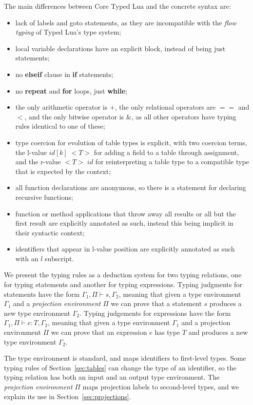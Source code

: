 \documentclass[preprint]{sigplanconf}
\newcommand{\env}{\Gamma}
\newcommand{\penv}{\Pi}
\begin{document}
The main differences between Core Typed Lua and the concrete
syntax are:
\begin{itemize}
\item lack of labels and goto statements, as they are incompatible
with the {\em flow typing} of Typed Lua's type system;
\item local variable declarations have an explicit block,
instead of being just statements;
\item no {\bf elseif} clause in {\bf if} statements;
\item no {\bf repeat} and {\bf for} loops, just {\bf while};
\item the only arithmetic operator is $+$, the only relational
operators are $==$ and $<$, and the only bitwise operator
is $\&$, as all other operators have typing rules identical to
one of these;
\item type coercion for evolution of table types is explicit,
with two coercion terms, the l-value $id[k] \; {<}T{>}$ for adding a field to 
a table through assignment, and the r-value ${<}T{>} \;id$ for reinterpreting
a table type to a compatible type that is expected by the context;
\item all function declarations are anonymous, so there is a
statement for declaring recursive functions;
\item function or method applications that throw away all
results or all but the first result are explicitly annotated
as such, instead this being implicit in their syntactic context;
\item identifiers that appear in l-value position are explicitly
annotated as such with an $l$ subscript.
\end{itemize}

We present the typing rules as a deduction system for two typing relations, one for typing statements and another for typing expressions. Typing judgments for statements have the form $\env_{1}, \penv \vdash s, \env_{2}$, meaning that
given a type environment $\env_{1}$ and a {\em projection environment} $\penv$ we can prove that a statement $s$ produces a new type environment $\env_{2}$. Typing judgements for
expressions have the form $\env_{1}, \penv \vdash e : T, \env_{2}$, meaning that given a type environment $\env_{1}$
and a projection environment $\penv$ we can prove that an expression $e$ has type $T$ and produces a new type environment $\env_{2}$.

The type environment is standard, and maps
identifiers to first-level types. Some typing rules of
Section~\ref{sec:tables} can change the type of an identifier,
so the typing relation has both an input and an output type
environment. The {\em projection environment} $\Pi$ maps projection labels to second-level types, and we explain
its use in Section~\ref{sec:projections}.
\end{document}
